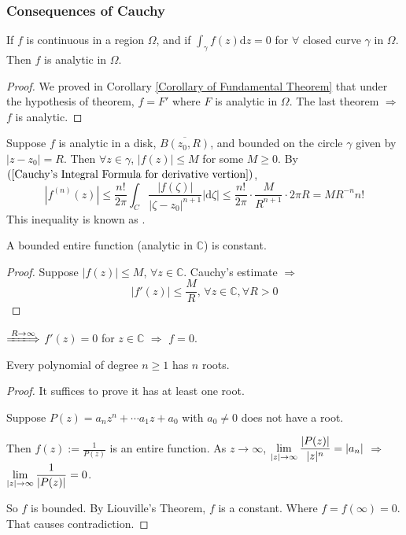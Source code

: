 \subsubsection{Consequences of Cauchy}
\begin{theorem}
    If  $ f $ is continuous in a region  $ \Omega $, and if  $ \int_\gamma f(z)\mathrm{d}z=0 $ for  $ \forall $ closed curve $ \gamma $ in  $ \Omega $. Then  $ f $ is analytic in   $ \Omega $.       
\end{theorem}
\begin{proof}
    We proved in Corollary \ref{Corollary of Fundamental Theorem} that under the hypothesis of theorem,  $ f=F' $ where  $ F $ is analytic in  $ \Omega $. The last theorem  $ \Rightarrow  $ $ f $ is analytic.
\end{proof}
Suppose  $ f $ is analytic in a disk, $ \overline{B(z_0,R)} $, and   bounded on the circle $ \gamma $ given by  $ |z-z_0|=R $. Then  $ \forall z\in \gamma $, $ |f(z)| \leq M $  for some  $ M \geq 0 $. By  $ (\ref{Cauchy's Integral Formula for derivative vertion}) $,
\begin{equation}
    |f^{(n)}(z)| \leq \frac{n!}{2\pi}\int_C\frac{|f(\zeta)|}{|\zeta-z_0|^{n+1}}|\mathrm{d}\zeta| \leq \frac{n!}{2\pi}\cdot\frac{M}{R^{n+1}}\cdot 2\pi R=MR^{-n}n!
\end{equation}    
This inequality is known as .
\begin{theorem}
    A bounded entire function (\ie analytic in  $ \mathbb{C} $) is constant.
\end{theorem}
\begin{proof}
    Suppose  $ |f(z)| \leq M $, $ \forall z\in \mathbb{C} $. Cauchy's estimate $ \Rightarrow   $ 
    \begin{equation}
        |f'(z)| \leq \frac{M}{R},\,\forall z\in \mathbb{C},\forall R>0
    \end{equation}  
\end{proof}
 $ \xLongrightarrow{R\to\infty}  $ $ f'(z)=0 $ for  $ z\in \mathbb{C} $   $ \Rightarrow  $ $ f=0 $.  
 \begin{theorem}
    Every polynomial of degree  $ n \geq 1 $ has  $ n $ roots.  
 \end{theorem}
\begin{proof}
    It suffices to prove it has at least one root.

    Suppose  $ P(z)=a_nz^n+\cdots a_1z+a_0 $ with  $ a_0\not=0 $ does not have a root.
    
    Then  $ f(z):=\frac{1}{P(z)} $ is an entire function. As  $ z\rightarrow \infty $,  $ \displaystyle\lim\limits_{|z|\to\infty}\frac{|P(z)|}{|z|^n}=|a_n| $ $ \Rightarrow  $ $ \displaystyle\lim\limits_{|z|\to\infty}\frac{1}{|P(z)|}=0 $.

    So  $ f $ is bounded. By Liouville's Theorem,  $ f  $ is a constant. Where  $ f=f(\infty)=0 $. That causes contradiction.   
\end{proof}
